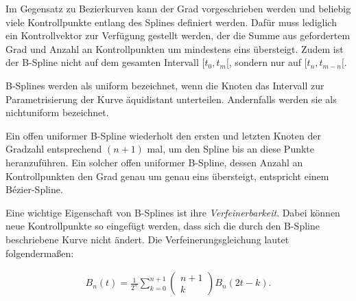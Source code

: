 \cite{kroemker:2008}

Im Gegensatz zu Bezierkurven kann der Grad vorgeschrieben werden und beliebig viele Kontrollpunkte entlang des Splines definiert werden.
Dafür muss lediglich ein Kontrollvektor zur Verfügung gestellt werden, der die Summe aus gefordertem Grad und Anzahl an Kontrollpunkten um mindestens eins übersteigt.
Zudem ist der B-Spline nicht auf dem gesamten Intervall $[t_{0}, t_{m}[$, sondern nur auf $[t_{n}, t_{m - n}[$. \cite{kroemker:2008}

B-Splines werden als uniform bezeichnet, wenn die Knoten das Intervall zur Parametrisierung der Kurve äquidistant unterteilen.
Andernfalls werden sie als nichtuniform bezeichnet. \cite{kroemker:2008}

Ein offen uniformer B-Spline wiederholt den ersten und letzten Knoten der Gradzahl entsprechend $(n + 1)$ mal, um den Spline bis an diese Punkte heranzuführen.
Ein solcher offen uniformer B-Spline, dessen Anzahl an Kontrollpunkten den Grad genau um genau eins übersteigt, entspricht einem Bézier-Spline. \cite{kroemker:2008}

Eine wichtige Eigenschaft von B-Splines ist ihre \textit{Verfeinerbarkeit}.
Dabei können neue Kontrollpunkte so eingefügt werden, dass sich die durch den B-Spline beschriebene Kurve nicht ändert.
Die Verfeinerungsgleichung lautet folgendermaßen:

\begin{align*}
B_{n} (t) = \frac{1}{2^{n}} \sum_{k=0}^{n + 1} \left(
\begin{array}{c}
n + 1\\
k
\end{array}
\right) B_{n}(2t - k).
\end{align*}

\cite{kroemker:2008}
